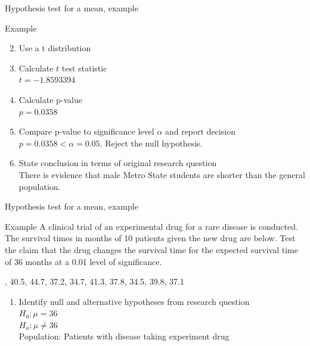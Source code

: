 \documentclass[xcolor=table, handout]{beamer}
\begin{document}
\begin{frame}{Hypothesis test for a mean, example}
\begin{exampleblock}{Example}
\large
\begin{enumerate}
\setcounter{enumi}{1}

\item Use a t distribution
\pause\item Calculate $t$ test statistic\\
\pause$t=-1.8593394$
\pause\item Calculate p-value\\
\pause$p = 0.0358$
\pause\item Compare p-value to significance level $\alpha$ and report decision\\
\pause$p = 0.0358 < \alpha = 0.05$. Reject the null hypothesis.
\pause\item State conclusion in terms of original research question\\
\pause There is evidence that male Metro State students are shorter than the general population.
\end{enumerate}

\end{exampleblock}
\end{frame}

\begin{frame}{Hypothesis test for a mean, example}
\begin{exampleblock}{Example}
\large
A clinical trial of an experimental drug for a rare disease is conducted. The survival times in months of 10 patients given the new drug are below. Test the claim that the drug changes the survival time for the expected survival time of 36 months at a 0.01 level of significance.\\
\medskip
{, 40.5, 44.7, 37.2, 34.7, 41.3, 37.8, 34.5, 39.8, 37.1
\par}
\begin{enumerate}
\pause\item Identify null and alternative hypotheses from research question\\
\pause$H_0: \mu = 36$\\
$H_a: \mu \ne 36$\\
Population: Patients with disease taking experiment drug
\end{enumerate}
\end{exampleblock}
\end{frame}
\end{document}
